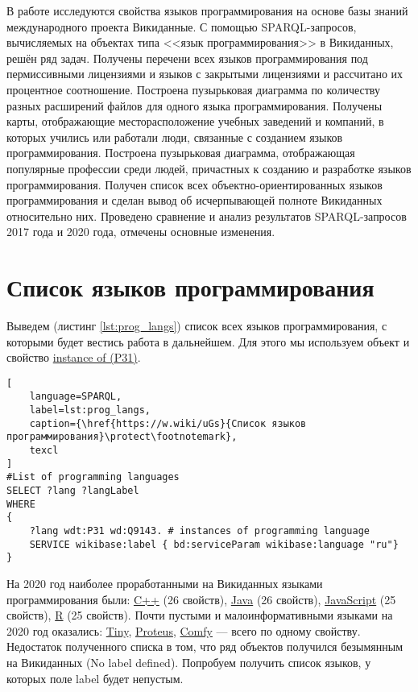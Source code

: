 В работе исследуются свойства языков программирования на основе базы знаний международного проекта Викиданные. С помощью SPARQL-запросов, вычисляемых на объектах типа <<язык программирования>>  в Викиданных, решён ряд задач. Получены перечени всех языков программирования под пермиссивными лицензиями и языков с закрытыми лицензиями и рассчитано их процентное соотношение. Построена пузырьковая диаграмма по количеству разных расширений файлов для одного языка программирования. Получены карты, отображающие месторасположение учебных заведений и компаний, в которых учились или работали люди, связанные с созданием языков программирования. Построена пузырьковая диаграмма, отображающая популярные профессии среди людей, причастных к созданию и разработке языков программирования. Получен список всех объектно-ориентированных языков программирования и сделан вывод об исчерпывающей полноте Викиданных относительно них. Проведено сравнение и анализ результатов SPARQL-запросов 2017 года и 2020 года, отмечены основные изменения. 

\section{Список языков программирования}
Выведем (листинг \ref{lst:prog_langs}) список всех языков программирования, с которыми будет вестись работа в дальнейшем. Для этого мы используем объект  и свойство \href{https://www.wikidata.org/wiki/Property:P31}{instance of (P31)}.

\begin{lstlisting}[
	language=SPARQL,
	label=lst:prog_langs,
	caption={\href{https://w.wiki/uGs}{Список языков программирования}\protect\footnotemark},
	texcl 
]
#List of programming languages
SELECT ?lang ?langLabel
WHERE
{
    ?lang wdt:P31 wd:Q9143. # instances of programming language
    SERVICE wikibase:label { bd:serviceParam wikibase:language "ru"}
}
\end{lstlisting}

На 2020 год наиболее проработанными на Викиданных языками программирования были: \href{https://www.wikidata.org/wiki/Q2407}{C++} (26 свойств), \href{https://www.wikidata.org/wiki/Q251}{Java} (26 свойств), \href{https://www.wikidata.org/wiki/Q2005}{JavaScript} (25 свойств), \href{https://www.wikidata.org/wiki/Q206904}{R} (25 свойств).
Почти пустыми и малоинформативными языками на 2020 год оказались\cite{prowd_langs_link}: \href{https://www.wikidata.org/wiki/Q3991643}{Tiny}, \href{https://www.wikidata.org/wiki/Q3924253}{Proteus}, \href{https://www.wikidata.org/wiki/Q21524853}{Comfy} --- всего по одному свойству.
Недостаток полученного списка в том, что ряд объектов получился безымянным на Викиданных (No label defined). Попробуем получить список языков, у которых поле label  будет непустым.

